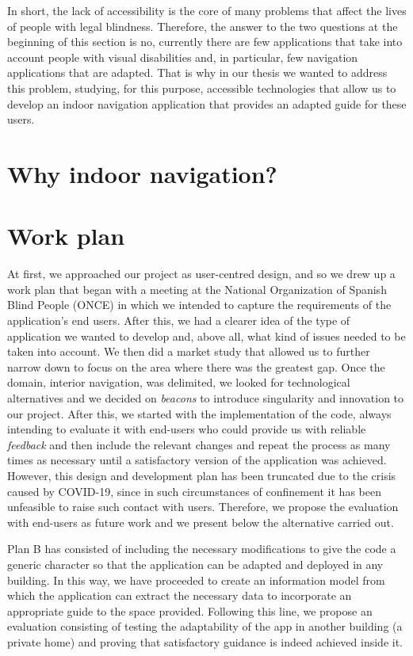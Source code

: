 In short, the lack of accessibility is the core of many problems that affect the lives of people with legal blindness. Therefore, the answer to the two questions at the beginning of this section is no, currently there are few applications that take into account people with visual disabilities and, in particular, few navigation applications that are adapted. That is why in our thesis we wanted to address this problem, studying, for this purpose, accessible technologies that allow us to develop an indoor navigation application that provides an adapted guide for these users.

\section{Why indoor navigation?}

\section{Work plan}
\label{sec:workPlan}


At first, we approached our project as user-centred design, and so we drew up a work plan that began with a meeting at the National Organization of Spanish Blind People (ONCE) in which we intended to capture the requirements of the application's end users. After this, we had a clearer idea of the type of application we wanted to develop and, above all, what kind of issues needed to be taken into account. We then did a market study that allowed us to further narrow down to focus on the area where there was the greatest gap. Once the domain, interior navigation, was delimited, we looked for technological alternatives and we decided on \textit{beacons} to introduce singularity and innovation to our project. After this, we started with the implementation of the code, always intending to evaluate it with end-users who could provide us with reliable \textit{feedback} and then include the relevant changes and repeat the process as many times as necessary until a satisfactory version of the application was achieved. However, this design and development plan has been truncated due to the crisis caused by COVID-19, since in such circumstances of confinement it has been unfeasible to raise such contact with users. Therefore, we propose the evaluation with end-users as future work and we present below the alternative carried out.

Plan B has consisted of including the necessary modifications to give the code a generic character so that the application can be adapted and deployed in any building. In this way, we have proceeded to create an information model from which the application can extract the necessary data to incorporate an appropriate guide to the space provided. Following this line, we propose an evaluation consisting of testing the adaptability of the app in another building (a private home) and proving that satisfactory guidance is indeed achieved inside it.


